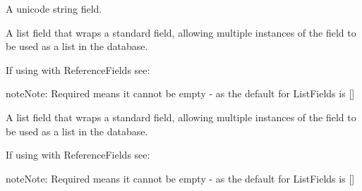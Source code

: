 \documentclass[letterpaper,10pt,english]{sphinxmanual}
\begin{document}
\begin{fulllineitems}

\begin{fulllineitems}
\label{\detokenize{flashcard:flashcard.Flashcard.objects}}
\end{fulllineitems}


\begin{fulllineitems}
\label{\detokenize{flashcard:flashcard.Flashcard.question}}
A unicode string field.

\end{fulllineitems}


\begin{fulllineitems}
\label{\detokenize{flashcard:flashcard.Flashcard.response_model}}
A list field that wraps a standard field, allowing multiple instances
of the field to be used as a list in the database.

If using with ReferenceFields see: 

\begin{sphinxadmonition}{note}{Note:}
Required means it cannot be empty - as the default for ListFields is {[}{]}
\end{sphinxadmonition}

\end{fulllineitems}


\begin{fulllineitems}
\label{\detokenize{flashcard:flashcard.Flashcard.sources}}
A list field that wraps a standard field, allowing multiple instances
of the field to be used as a list in the database.

If using with ReferenceFields see: 

\begin{sphinxadmonition}{note}{Note:}
Required means it cannot be empty - as the default for ListFields is {[}{]}
\end{sphinxadmonition}

\end{fulllineitems}


\end{fulllineitems}
\end{document}
